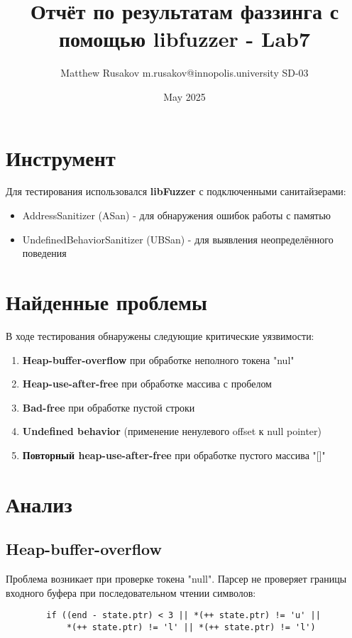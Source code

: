 \usepackage[utf8]{inputenc}
\usepackage{geometry}
\usepackage[T1]{fontenc}
\usepackage[russian]{babel}

\title{Отчёт по результатам фаззинга с помощью libfuzzer - Lab7}
\author{Matthew Rusakov m.rusakov@innopolis.university SD-03}
\date{May 2025}



    \maketitle


    \section{Инструмент}
    Для тестирования использовался \textbf{libFuzzer} с подключенными санитайзерами:
    \begin{itemize}
        \item AddressSanitizer (ASan) - для обнаружения ошибок работы с памятью
        \item UndefinedBehaviorSanitizer (UBSan) - для выявления неопределённого поведения
    \end{itemize}


    \section{Найденные проблемы}
    В ходе тестирования обнаружены следующие критические уязвимости:

    \begin{enumerate}
        \item \textbf{Heap-buffer-overflow} при обработке неполного токена "nul"
        \item \textbf{Heap-use-after-free} при обработке массива с пробелом
        \item \textbf{Bad-free} при обработке пустой строки
        \item \textbf{Undefined behavior} (применение ненулевого offset к null pointer)
        \item \textbf{Повторный heap-use-after-free} при обработке пустого массива "[]"
    \end{enumerate}


    \section{Анализ}

    \subsection{Heap-buffer-overflow}
    Проблема возникает при проверке токена "null".
    Парсер не проверяет границы входного буфера при последовательном чтении символов:
    \begin{verbatim}
        if ((end - state.ptr) < 3 || *(++ state.ptr) != 'u' ||
            *(++ state.ptr) != 'l' || *(++ state.ptr) != 'l')
    \end{verbatim}

